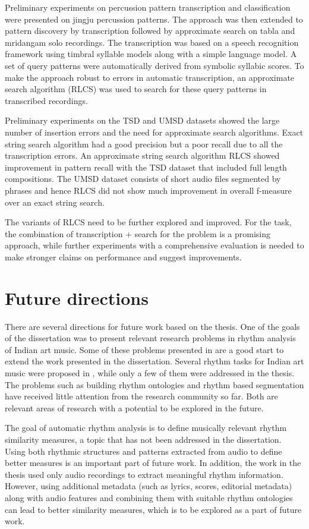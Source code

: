 Preliminary experiments on percussion pattern transcription and classification were presented on \gls{jingju} percussion patterns. The approach was then extended to pattern discovery by transcription followed by approximate search on \gls{tabla} and mridangam solo recordings. The transcription was based on a speech recognition framework using timbral syllable models along with a simple language model. A set of query patterns were automatically derived from symbolic syllabic scores. To make the approach robust to errors in automatic transcription, an approximate search algorithm (\gls{RLCS}) was used to search for these query patterns in transcribed recordings. 

Preliminary experiments on the \acrshort{TSD} and \acrshort{UMSD} datasets showed the large number of insertion errors and the need for approximate search algorithms. Exact string search algorithm had a good precision but a poor recall due to all the transcription errors. An approximate string search algorithm \gls{RLCS} showed improvement in pattern recall with the \acrshort{TSD} dataset that included full length compositions. The \acrshort{UMSD} dataset consists of short audio files segmented by phrases and hence \gls{RLCS} did not show much improvement in overall f-measure over an exact string search. 

The variants of \gls{RLCS} need to be further explored and improved. For the task, the combination of transcription + search for the problem is a promising approach, while further experiments with a comprehensive evaluation is needed to make stronger claims on performance and suggest improvements. 
%
\section{Future directions}
There are several directions for future work based on the thesis. One of the goals of the dissertation was to present relevant research problems in rhythm analysis of Indian art music. Some of these problems presented in  are a good start to extend the work presented in the dissertation. Several rhythm tasks for Indian art music were proposed in , while only a few of them were addressed in the thesis. The problems such as building rhythm ontologies and rhythm based segmentation have received little attention from the research community so far. Both are relevant areas of research with a potential to be explored in the future. 

The goal of automatic rhythm analysis is to define musically relevant rhythm similarity measures, a topic that has not been addressed in the dissertation. Using both rhythmic structures and patterns extracted from audio to define better measures is an important part of future work. In addition, the work in the thesis used only audio recordings to extract meaningful rhythm information. However, using additional metadata (such as lyrics, scores, editorial metadata) along with audio features and combining them with suitable rhythm ontologies can lead to better similarity measures, which is to be explored as a part of future work. 

